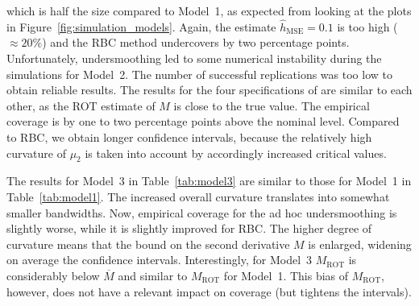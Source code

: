 which is half the size compared to Model~1, as expected from looking at the plots in Figure~\ref{fig:simulation_models}.
Again, the estimate $\hat{h}_{\text{MSE}} = 0.1$ is too high ($\approx 20\%$) and the RBC method undercovers by two percentage points.
Unfortunately, undersmoothing led to some numerical instability during the simulations for Model~2.
The number of successful replications was too low to obtain reliable results.
The results for the four specifications of \citeauthor{Armstrong_2020} are similar to each other,
as the ROT estimate of $M$ is close to the true value.
The empirical coverage is by one to two percentage points above the nominal level.
Compared to RBC, we obtain longer confidence intervals,
because the relatively high curvature of $\mu_{2}$ is taken into account by accordingly increased critical values.

The results for Model~3 in Table~\ref{tab:model3} are similar to those for Model~1 in Table~\ref{tab:model1}.
The increased overall curvature translates into somewhat smaller bandwidths.
Now, empirical coverage for the ad hoc undersmoothing is slightly worse,
while it is slightly improved for RBC.
The higher degree of curvature means that the bound on the second derivative $M$ is enlarged,
widening on average the \citeauthor{Armstrong_2020} confidence intervals.
Interestingly, for Model~3 $M_{\text{ROT}}$ is considerably below $\overbar{M}$ and similar to $M_{\text{ROT}}$ for Model~1.
This bias of $M_{\text{ROT}}$, however, does not have a relevant impact on coverage (but tightens the intervals).       

